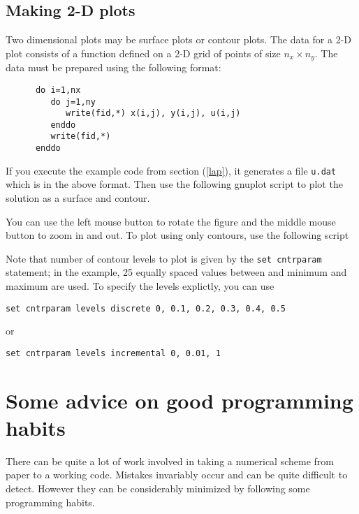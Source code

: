 \documentclass[11pt,oneside]{amsart}
\begin{document}
\subsection{Making 2-D plots}
Two dimensional plots may be surface plots or contour plots. The data for a 2-D plot consists of a function defined on a 2-D grid of points of size $n_x \times n_y$. The data must be prepared using the following format:
\begin{verbatim}
      do i=1,nx
         do j=1,ny
            write(fid,*) x(i,j), y(i,j), u(i,j)
         enddo
         write(fid,*)
      enddo
\end{verbatim}
If you execute the example code from section (\ref{lap}), it generates a file {\tt u.dat} which is in the above format. Then use the following gnuplot script to plot the solution as a surface and contour.

You can use the left mouse button to rotate the figure and the middle mouse button to zoom in and out. To plot using only contours, use the following script

Note that number of contour levels to plot is given by the {\tt set cntrparam} statement; in the example, 25 equally spaced values between and minimum and maximum are used. To specify the levels explictly, you can use
\begin{verbatim}
set cntrparam levels discrete 0, 0.1, 0.2, 0.3, 0.4, 0.5
\end{verbatim}
or
\begin{verbatim}
set cntrparam levels incremental 0, 0.01, 1
\end{verbatim}

\section{Some advice on good programming habits}

There can be quite a lot of work involved in taking a numerical scheme from paper to a working code. Mistakes invariably occur and can be quite difficult to detect. However they can be considerably minimized by following some programming habits.
\end{document}
